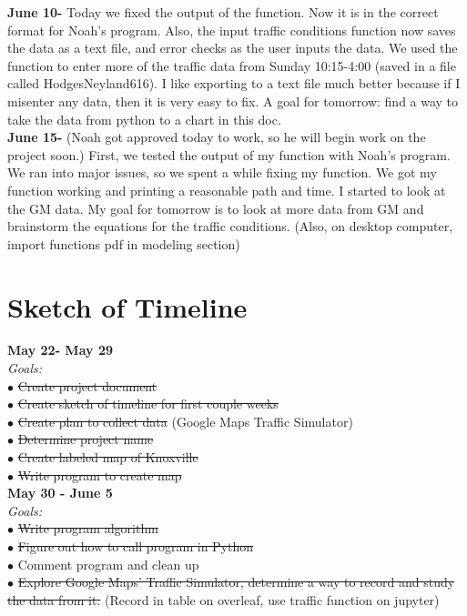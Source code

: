 \documentclass{article}
\begin{document}
\textbf{June 10-} Today we fixed the output of the function. Now it is in the correct format for Noah's program. Also, the input traffic conditions function now saves the data as a text file, and error checks as the user inputs the data. We used the function to enter more of the traffic data from Sunday 10:15-4:00 (saved in a file called HodgesNeyland616). I like exporting to a text file much better because if I misenter any data, then it is very easy to fix. A goal for tomorrow: find a way to take the data from python to a chart in this doc. \\

\textbf{June 15-} (Noah got approved today to work, so he will begin work on the project soon.) First, we tested the output of my function with Noah's program. We ran into major issues, so we spent a while fixing my function. We got my function working and printing a reasonable path and time. I started to look at the GM data. My goal for tomorrow is to look at more data from GM and brainstorm the equations for the traffic conditions. (Also, on desktop computer, import functions pdf in modeling section) \\ 


\newpage
\section{Sketch of Timeline} 
\hspace{0.23in}\large\textbf{May 22- May 29} \\
\normalsize\textit{Goals:} \\
$\bullet$ \sout{Create project document} \\
$\bullet$ \sout{Create sketch of timeline for first couple weeks}\\
$\bullet$ \sout{Create plan to collect data} (Google Maps Traffic Simulator) \\
$\bullet$ \sout{Determine project name} \\
$\bullet$ \sout{Create labeled map of Knoxville} \\
$\bullet$ \sout{Write program to create map} \\

\large\textbf{May 30 - June 5}\\
\normalsize\textit{Goals:} \\
$\bullet$ \sout{Write program algorithm} \\
$\bullet$ \sout{Figure out how to call program in Python} \\
$\bullet$ Comment program and clean up \\
$\bullet$ \sout{Explore Google Maps' Traffic Simulator, determine a way to record and study the data from it.} (Record in table on overleaf, use traffic function on jupyter) \\
\end{document}
